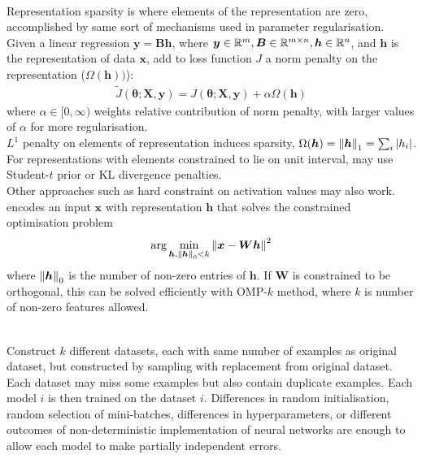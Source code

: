 \begin{remark} \\
Representation sparsity is where elements of the representation are zero, accomplished by same sort of mechanisms used in parameter regularisation.\\
Given a linear regression $\bm{y} = \bm{B} \bm{h}$, where $\bm{y} \in \mathbb{R}^m, \bm{B} \in \mathbb{R}^{m \times n}, \bm{h} \in \mathbb{R}^n$, and $\bm{h}$ is the representation of data $\bm{x}$, add to loss function $J$ a norm penalty on the representation ($\Omega(\bm{h}))$):
\begin{align}
\tilde{J}(\bm{\theta}; \bm{X}, \bm{y}) = J(\bm{\theta}; \bm{X}, \bm{y}) + \alpha \Omega (\bm{h}) \nonumber
\end{align}
where $\alpha \in [0, \infty)$ weights relative contribution of norm penalty, with larger values of $\alpha$ for more regularisation.\\
$L^1$ penalty on elements of representation induces sparsity, $\Omega(\bm{h}) = \left\lVert\bm{h}\right\rVert_1 = \sum_i \left\lvert h_i\right\rvert$. For representations with elements constrained to lie on unit interval, may use Student-$t$ prior or KL divergence penalties.\\
Other approaches such as hard constraint on activation values may also work.  encodes an input $\bm{x}$ with representation $\bm{h}$ that solves the constrained optimisation problem
\begin{align}
\arg \min_{\bm{h}, \left\lVert\bm{h}\right\rVert_0 < k} \left\lVert\bm{x} - \bm{W} \bm{h}\right\rVert^2 \nonumber
\end{align}
where $\left\lVert\bm{h}\right\rVert_0$ is the number of non-zero entries of $\bm{h}$. If $\bm{W}$ is constrained to be orthogonal, this can be solved efficiently with OMP-$k$ method, where $k$ is number of non-zero features allowed.
\end{remark}

\begin{remark} \\
Construct $k$ different datasets, each with same number of examples as original dataset, but constructed by sampling with replacement from original dataset. Each dataset may miss some examples but also contain duplicate examples. Each model $i$ is then trained on the dataset $i$. Differences in random initialisation, random selection of mini-batches, differences in hyperparameters, or different outcomes of non-deterministic implementation of neural networks are enough to allow each model to make partially independent errors.
\end{remark}


